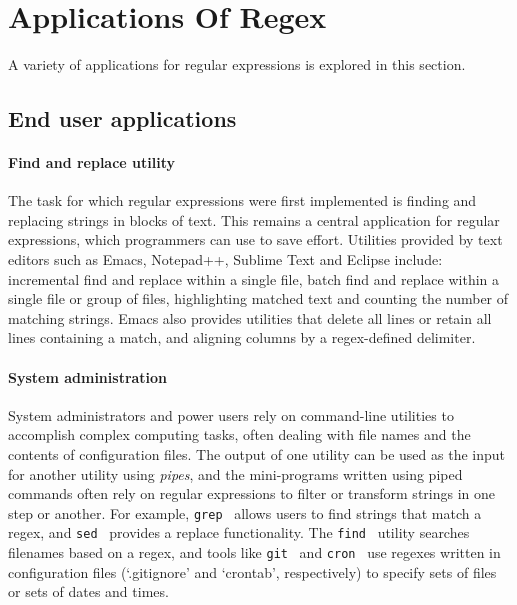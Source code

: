 \section{Applications Of Regex}
\label{sec:applications}
A variety of applications for regular expressions is explored in this section.

\subsection{End user applications}
\paragraph{Find and replace utility}  The task for which regular expressions were first implemented is finding and replacing strings in blocks of text.  This remains a central application for regular expressions, which programmers can use to save effort.  Utilities provided by text editors such as Emacs, Notepad++, Sublime Text and Eclipse include: incremental find and replace within a single file, batch find and replace within a single file or group of files, highlighting matched text and counting the number of matching strings.  Emacs also provides utilities that delete all lines or retain all lines containing a match, and aligning columns by a regex-defined delimiter.

\paragraph{System administration}  System administrators and power users rely on command-line utilities to accomplish complex computing tasks, often dealing with file names and the contents of configuration files.  The output of one utility can be used as the input for another utility using \emph{pipes}, and the mini-programs written using piped commands often rely on regular expressions to filter or transform strings in one step or another.  For example, {\tt grep}~\citep{grepManual} allows users to find strings that match a regex, and {\tt sed}~\citep{sedManual} provides a replace functionality.  The {\tt find}~\citep{findManual} utility searches filenames based on a regex, and tools like {\tt git}~\citep{gitManual} and {\tt cron}~\citep{cronManual} use regexes written in configuration files (`.gitignore' and `crontab', respectively) to specify sets of files or sets of dates and times.

